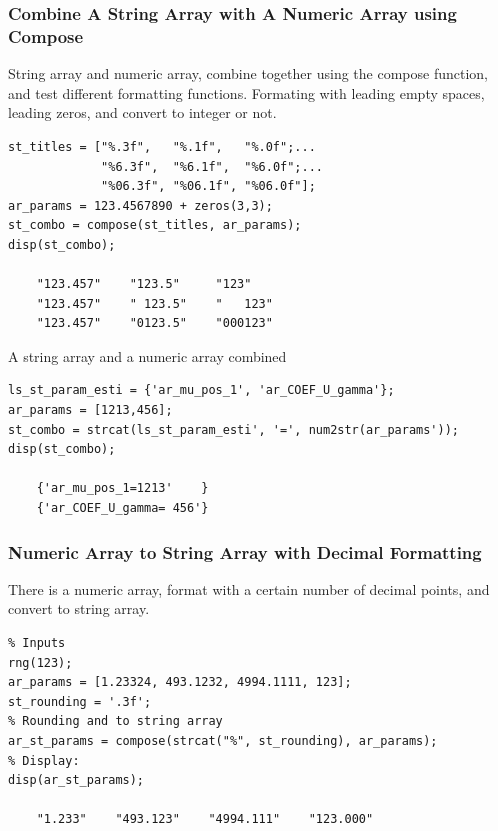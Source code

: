 \documentclass[
]{book}
\begin{document}
\hypertarget{combine-a-string-array-with-a-numeric-array-using-compose}{%
\subsubsection{Combine A String Array with A Numeric Array using Compose}\label{combine-a-string-array-with-a-numeric-array-using-compose}}

String array and numeric array, combine together using the compose
function, and test different formatting functions. Formating with
leading empty spaces, leading zeros, and convert to integer or not.

\begin{verbatim}
st_titles = ["%.3f",   "%.1f",   "%.0f";...
             "%6.3f",  "%6.1f",  "%6.0f";...
             "%06.3f", "%06.1f", "%06.0f"];
ar_params = 123.4567890 + zeros(3,3);
st_combo = compose(st_titles, ar_params);
disp(st_combo);

    "123.457"    "123.5"     "123"   
    "123.457"    " 123.5"    "   123"
    "123.457"    "0123.5"    "000123"
\end{verbatim}

A string array and a numeric array combined

\begin{verbatim}
ls_st_param_esti = {'ar_mu_pos_1', 'ar_COEF_U_gamma'};
ar_params = [1213,456];
st_combo = strcat(ls_st_param_esti', '=', num2str(ar_params'));
disp(st_combo);

    {'ar_mu_pos_1=1213'    }
    {'ar_COEF_U_gamma= 456'}
\end{verbatim}

\hypertarget{numeric-array-to-string-array-with-decimal-formatting}{%
\subsubsection{Numeric Array to String Array with Decimal Formatting}\label{numeric-array-to-string-array-with-decimal-formatting}}

There is a numeric array, format with a certain number of decimal
points, and convert to string array.

\begin{verbatim}
% Inputs
rng(123);
ar_params = [1.23324, 493.1232, 4994.1111, 123];
st_rounding = '.3f';
% Rounding and to string array
ar_st_params = compose(strcat("%", st_rounding), ar_params);
% Display:
disp(ar_st_params);

    "1.233"    "493.123"    "4994.111"    "123.000"
\end{verbatim}
\end{document}

